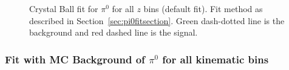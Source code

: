 \begin{figure}[H]
\label{fig:pi0zfit}
\caption[Crystal Ball fit for $\pi^0$ for all $z$ bins]{Crystal Ball fit for $\pi^0$ for all $z$ bins (default fit). Fit method as described in Section~\ref{sec:pi0fitsection}. Green dash-dotted line is the background and red dashed line is the signal.}
\end{figure}



\subsubsection{\texorpdfstring{Fit with MC Background of $\pi^0$ for all kinematic bins}{Fit with MC Background of pi0 for all kinematic bins}}
\label{sec:bkgfitpi0}

